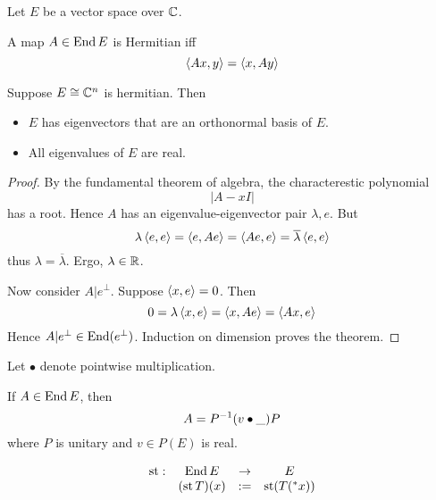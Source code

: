 \documentclass{scrartcl}
\newcommand{\conj}[1]{\overline{#1}}
\newcommand{\hyper}[1]{\prescript{*}{}{#1}}
\renewcommand{\define}{:=}
\DeclareMathOperator{\st}{st}
\begin{document}
  Let $E$ be a vector space over $\mathbb{C}$. 
\begin{defn}[Hermitian]
  A map $A\in \operatorname{End}{E}$ is Hermitian iff
  \[
    \left\langle Ax, y \right\rangle=\left\langle x, Ay \right\rangle
  \]
\end{defn}
\begin{theorem}
  \label{finite-spectral-theorem}
  Suppose $E\cong \mathbb{C}^n$ is hermitian. Then
  \begin{itemize}
  \item $E$ has eigenvectors that are an orthonormal basis of $E$.
  \item All eigenvalues of $E$ are real. 
  \end{itemize}

\end{theorem}
\begin{proof}
  \renewcommand{\vec}{}
  By the fundamental theorem of algebra, the characterestic polynomial
  \[
    |A-xI|
  \]
  has a root. Hence $A$ has an eigenvalue-eigenvector pair $\lambda, \vec e$. But
  \[
    \lambda \inner{\vec e}{\vec e}=\inner{\vec e}{A \vec e}=\inner{A\vec e}{\vec e}=\conj\lambda \inner{\vec e}{\vec e}
  \]
  thus $\lambda = \conj\lambda$. Ergo, $\lambda\in \mathbb{R}$. 

  Now consider $A|e^\perp$. Suppose $\left\langle x, e \right\rangle=0$. Then 
  \[
    0=\lambda\left\langle x, e \right\rangle=\left\langle x, Ae \right\rangle=\left\langle Ax, e \right\rangle
  \]
  Hence $A|e^\perp\in\operatorname{End}(e^\perp)$. Induction on dimension proves the theorem. 
\end{proof}

Let $\bullet$ denote pointwise multiplication. 
\begin{cor}[diagonalization]
  \label{thm:diag}
  If $A\in\operatorname{End} E$, then 
  \[
    A=P^{-1}(v\bullet\_)P\\
  \]
  where $P$ is unitary and $v\in P(E)$ is real.
\end{cor}

\begin{defn}
  \[
  \begin{matrix}
   \st: &\End E &\to &E \\
    &(\st T)(x) &\define& \st( T(\hyper x))
  \end{matrix}
  \]
\end{defn}
\end{document}
